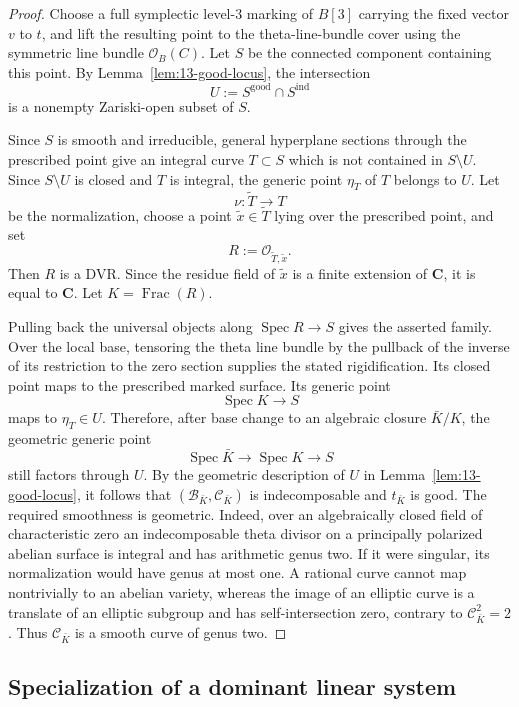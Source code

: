 \documentclass[12pt]{amsart}
\numberwithin{equation}{section}
\theoremstyle{definition}
\theoremstyle{remark}
\newcommand{\C}{\mathbf C}
\newcommand{\Spec}{\operatorname{Spec}}
\begin{document}
\begin{proof}
Choose a full symplectic level-$3$ marking of $B[3]$ carrying the fixed
vector $v$ to $t$, and lift the resulting point to the
theta-line-bundle cover using the symmetric line bundle
$\mathcal O_B(C)$.  Let $S$ be the connected component containing this
point.  By Lemma~\ref{lem:13-good-locus}, the intersection
\[
U
:=
S^{\mathrm{good}}\cap S^{\mathrm{ind}}
\]
is a nonempty Zariski-open subset of $S$.

Since $S$ is smooth and irreducible, general hyperplane sections through
the prescribed point give an integral curve $T\subset S$ which is not
contained in $S\setminus U$.  Since $S\setminus U$ is
closed and $T$ is integral, the generic point $\eta_T$ of $T$ belongs
to $U$.  Let
\[
\nu:\widetilde T\to T
\]
be the normalization, choose a point $\tilde x\in\widetilde T$ lying
over the prescribed point, and set
\[
R:=\mathcal O_{\widetilde T,\tilde x}.
\]
Then $R$ is a DVR.  Since the residue field of $\tilde x$ is a finite
extension of $\C$, it is equal to $\C$.  Let $K=\operatorname{Frac}(R)$.

Pulling back the universal objects along
$\Spec R\to S$ gives the asserted family.  Over the local base, tensoring
the theta line bundle by the pullback of the inverse of its restriction
to the zero section supplies the stated rigidification.  Its closed point maps to the
prescribed marked surface.  Its generic point
\[
\Spec K\longrightarrow S
\]
maps to $\eta_T\in U$.  Therefore, after base change to an algebraic
closure $\bar K/K$, the geometric generic point
\[
\Spec\bar K\longrightarrow\Spec K\longrightarrow S
\]
still factors through $U$.  By the geometric description of $U$ in
Lemma~\ref{lem:13-good-locus}, it follows that
$(\mathscr B_{\bar K},\mathscr C_{\bar K})$ is indecomposable and
$t_{\bar K}$ is good.  The required smoothness is geometric.  Indeed,
over an algebraically closed field of characteristic zero an
indecomposable theta divisor on a principally polarized abelian surface
is integral and has arithmetic genus two.  If it were singular, its
normalization would have genus at most one.  A rational curve cannot map
nontrivially to an abelian variety, whereas the image of an elliptic curve
is a translate of an elliptic subgroup and has self-intersection zero,
contrary to $\mathscr C_{\bar K}^2=2$.  Thus
$\mathscr C_{\bar K}$ is a smooth curve of genus two.
\end{proof}

\subsection{Specialization of a dominant linear system}
\end{document}
